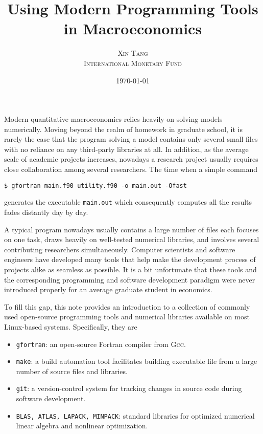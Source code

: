 \documentclass[twoside,12pt,leqno]{article}
\title{\vspace{-1cm}\Large{{\textsf{Using Modern Programming Tools in Macroeconomics}}}}
\author{\normalsize\textsc{Xin Tang} \\ \normalsize\textsc{International Monetary Fund}}
\date{\normalsize\today}
\newcommand{\code}{\texttt}
\begin{document}
\maketitle

Modern quantitative macroeconomics relies heavily on solving models numerically. Moving beyond the realm of homework in graduate school, it is rarely the case that the program solving a model contains only several small files with no reliance on any third-party libraries at all. In addition, as the average scale of academic projects increases, nowadays a research project usually requires close collaboration among several researchers. The time when a simple command
\begin{verbatim}
$ gfortran main.f90 utility.f90 -o main.out -Ofast
\end{verbatim}
generates the executable \code{main.out} which consequently computes all the results fades distantly day by day.

A typical program nowadays usually contains a large number of files each focuses on one task, draws heavily on well-tested numerical libraries, and involves several contributing researchers simultaneously. Computer scientists and software engineers have developed many tools that help make the development process of projects alike as seamless as possible. It is a bit unfortunate that these tools and the corresponding programming and software development paradigm were never introduced properly for an average graduate student in economics.

To fill this gap, this note provides an introduction to a collection of commonly used open-source programming tools and numerical libraries available on most Linux-based systems. Specifically, they are
\begin{itemize}
    \item
    \code{gfortran}: an open-source Fortran compiler from \textsc{Gcc}.
    \item
    \code{make}: a build automation tool facilitates building executable file from a large number of source files and libraries.
    \item
    \code{git}: a version-control system for tracking changes in source code during software development.
    \item
    \code{BLAS, ATLAS, LAPACK, MINPACK}: standard libraries for optimized numerical linear algebra and nonlinear optimization.
\end{itemize}
\end{document}
